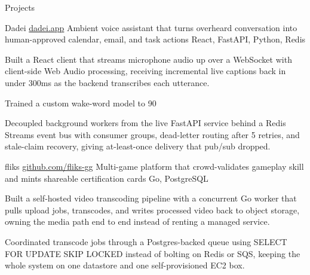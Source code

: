 \documentclass[
	11pt
]{../../../template}
\begin{document}
	\begin{rSection}{P}{rojects}
		\begin{rSectionEntry}
			{Dadei}
			{\href{https://dadei.app}{dadei.app}}
			{Ambient voice assistant that turns overheard conversation into human-approved calendar, email, and task actions}
			{React, FastAPI, Python, Redis}
			{}

			\item Built a React client that streams microphone audio up over a WebSocket with client-side Web Audio processing, receiving incremental live captions back in under 300ms as the backend transcribes each utterance.
			\item Trained a custom wake-word model to 90%
			\item Decoupled background workers from the live FastAPI service behind a Redis Streams event bus with consumer groups, dead-letter routing after 5 retries, and stale-claim recovery, giving at-least-once delivery that pub/sub dropped.
		\end{rSectionEntry}

		\begin{rSectionEntry}
			{fliks}
			{\href{https://github.com/fliks-gg}{github.com/fliks-gg}}
			{Multi-game platform that crowd-validates gameplay skill and mints shareable certification cards}
			{Go, PostgreSQL}
			{}

			\item Built a self-hosted video transcoding pipeline with a concurrent Go worker that pulls upload jobs, transcodes, and writes processed video back to object storage, owning the media path end to end instead of renting a managed service.
			\item Coordinated transcode jobs through a Postgres-backed queue using SELECT FOR UPDATE SKIP LOCKED instead of bolting on Redis or SQS, keeping the whole system on one datastore and one self-provisioned EC2 box.
		\end{rSectionEntry}
	\end{rSection}
\end{document}
